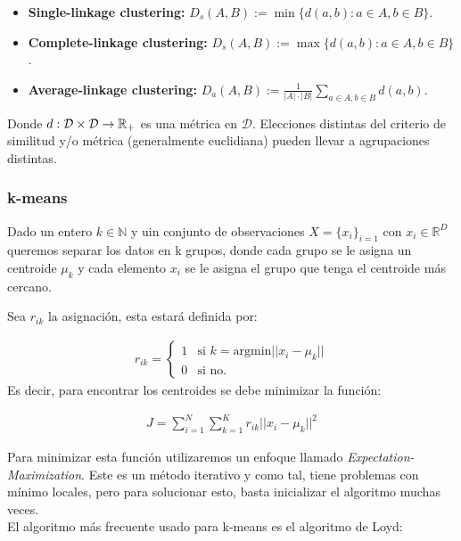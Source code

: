 \begin{itemize}
	\item \textbf{Single-linkage clustering:} $D_s(A,B):=\min\{d(a,b):a\in A, b\in B\}$.
	\item \textbf{Complete-linkage clustering:} $D_s(A,B):=\max\{d(a,b):a\in A, b\in B\}$.
	\item \textbf{Average-linkage clustering:} $D_a(A,B):=\frac{1}{|A|\cdot|B|}\sum_{a\in A, b\in B} d(a,b)$.
\end{itemize}

Donde $d:\mathcal{D}\times \mathcal{D}\to \mathbb{R}_+$ es una métrica en $\mathcal{D}$. Elecciones distintas del criterio de similitud y/o métrica (generalmente euclidiana) pueden llevar a agrupaciones distintas.

\subsubsection{k-means}
Dado un entero $k \in \mathbb{N}$ y uin conjunto de observaciones $X = \{x_i\}_{i=1}$ con $x_i\in \mathbb{R}^D$ queremos separar los datos en k grupos, donde cada grupo se le asigna un centroide $\mu_k$ y cada elemento $x_i$ se le asigna el grupo que tenga el centroide más cercano.

Sea $r_{ik}$ la asignación, esta estará definida por:

\begin{align}
r_{ik} = \begin{cases}
1 & \text{si } k = \text{argmin}||x_i-\mu_k||\\
0 & \text{si no.}
\end{cases}
\end{align}
Es decir, para encontrar los centroides se debe minimizar la función:

\begin{align}
J = \sum_{i=1}^N \sum_{k=1}^K r_{ik} ||x_i-\mu_k||^2
\end{align}

Para minimizar esta función utilizaremos un enfoque llamado \emph{Expectation-Maximization}. Este es un método iterativo y como tal, tiene problemas con mínimo locales, pero para solucionar esto, basta inicializar el algoritmo muchas veces.\\

El algoritmo más frecuente usado para k-means es el algoritmo de Loyd:

